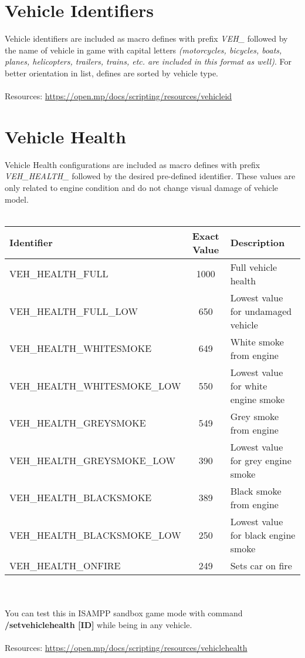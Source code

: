 \documentclass{article}
\begin{document}
\section{Vehicle Identifiers}
Vehicle identifiers are included as macro defines with prefix \textit{VEH\_} followed by the name of vehicle in game with capital letters \textit{(motorcycles, bicycles, boats, planes, helicopters, trailers, trains, etc. are included in this format as well)}. For better orientation in list, defines are sorted by vehicle type.
\\
\\Resources: \url{https://open.mp/docs/scripting/resources/vehicleid}


\section{Vehicle Health}
Vehicle Health configurations are included as macro defines with prefix \textit{VEH\_HEALTH\_} followed by the desired pre-defined identifier. These values are only related to engine condition and do not change visual damage of vehicle model.
\\
\\
\begin{tabular}{ |l|c|l| } 
\hline
Identifier & Exact Value & Description \\
\hline
VEH\_HEALTH\_FULL & 1000 & Full vehicle health \\ 
VEH\_HEALTH\_FULL\_LOW & 650 &  Lowest value for undamaged vehicle \\ 
VEH\_HEALTH\_WHITESMOKE & 649 & White smoke from engine \\ 
VEH\_HEALTH\_WHITESMOKE\_LOW & 550 & Lowest value for white engine smoke \\ 
VEH\_HEALTH\_GREYSMOKE & 549 & Grey smoke from engine \\ 
VEH\_HEALTH\_GREYSMOKE\_LOW & 390 & Lowest value for grey engine smoke\\ 
VEH\_HEALTH\_BLACKSMOKE & 389 & Black smoke from engine \\ 
VEH\_HEALTH\_BLACKSMOKE\_LOW & 250 & Lowest value for black engine smoke \\ 
VEH\_HEALTH\_ONFIRE & 249 & Sets car on fire \\
\hline
\end{tabular}
\\
\\
You can test this in ISAMPP sandbox game mode with command \textbf{/setvehiclehealth [ID]} while being in any vehicle.
\\
\\Resources: \url{https://open.mp/docs/scripting/resources/vehiclehealth}
\end{document}
